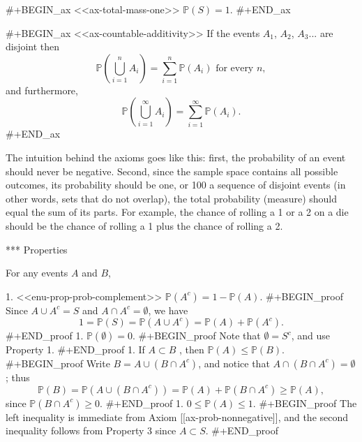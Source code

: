 #+BEGIN_ax
<<ax-total-mass-one>> \(\mathbb{P}(S)=1\).
#+END_ax

#+BEGIN_ax
<<ax-countable-additivity>> If the events \(A_{1}\), \(A_{2}\),
\(A_{3}\)... are disjoint then
\begin{equation}
\mathbb{P}\left(\bigcup_{i=1}^{n}A_{i}\right)=\sum_{i=1}^{n}\mathbb{P}(A_{i})\mbox{ for every }n,
\end{equation}
and furthermore,
\begin{equation}
\mathbb{P}\left(\bigcup_{i=1}^{\infty}A_{i}\right)=\sum_{i=1}^{\infty}\mathbb{P}(A_{i}).
\end{equation}
#+END_ax

The intuition behind the axioms goes like this: first, the probability
of an event should never be negative. Second, since the sample space
contains all possible outcomes, its probability should be one, or
100%
a sequence of disjoint events (in other words, sets that do not
overlap), the total probability (measure) should equal the sum of its
parts. For example, the chance of rolling a 1 or a 2 on a die should
be the chance of rolling a 1 plus the chance of rolling a 2.

*** Properties

For any events \(A\) and \(B\),

1. <<enu-prop-prob-complement>> \(\mathbb{P}(A^{c})=1-\mathbb{P}(A)\).
   #+BEGIN_proof
   Since \(A\cup A^{c}=S\) and \(A\cap A^{c}=\emptyset\), we have
   \[
   1=\mathbb{P}(S)=\mathbb{P}(A\cup A^{c})=\mathbb{P}(A)+\mathbb{P}(A^{c}).
   \]
   #+END_proof
1. \(\mathbb{P}(\emptyset)=0\).
   #+BEGIN_proof
   Note that \(\emptyset=S^{c}\), and use Property 1.
   #+END_proof
1. If \(A\subset B\) , then \(\mathbb{P}(A)\leq\mathbb{P}(B)\).
   #+BEGIN_proof
   Write \(B=A\cup\left(B\cap A^{c}\right)\), and notice that \(A\cap\left(B\cap A^{c}\right)=\emptyset\); thus
   \[
   \mathbb{P}(B)=\mathbb{P}(A\cup\left(B\cap A^{c}\right))=\mathbb{P}(A)+\mathbb{P}\left(B\cap A^{c}\right)\geq\mathbb{P}(A),
   \]
   since \(\mathbb{P}\left(B\cap A^{c}\right)\ge0\). 
   #+END_proof
1. \(0\leq\mathbb{P}(A)\leq1\).
   #+BEGIN_proof
   The left inequality is immediate from Axiom [[ax-prob-nonnegative]], and the second inequality follows from Property 3 since \(A\subset S\).
   #+END_proof

